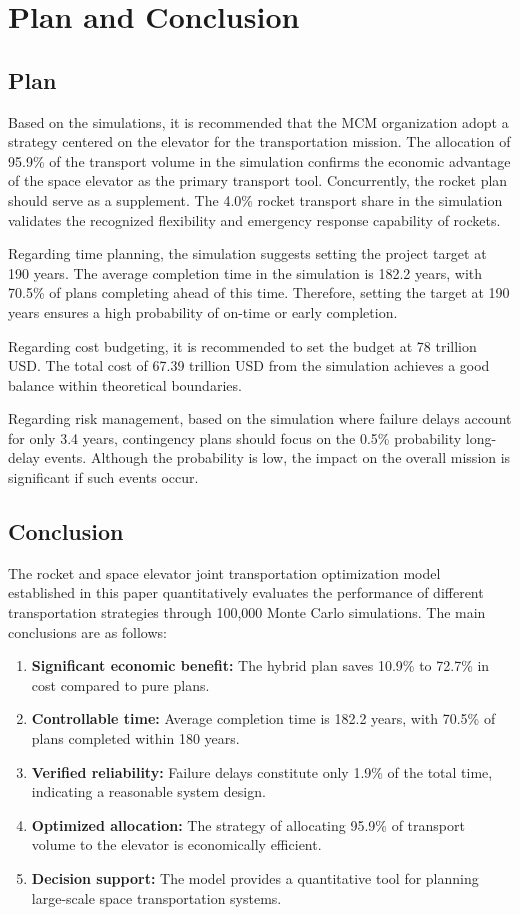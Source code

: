 \documentclass{article}
\begin{document}
\section{Plan and Conclusion}
\subsection{Plan}
Based on the simulations, it is recommended that the MCM organization adopt a strategy centered on the elevator for the transportation mission. The allocation of 95.9\% of the transport volume in the simulation confirms the economic advantage of the space elevator as the primary transport tool. Concurrently, the rocket plan should serve as a supplement. The 4.0\% rocket transport share in the simulation validates the recognized flexibility and emergency response capability of rockets.

Regarding time planning, the simulation suggests setting the project target at 190 years. The average completion time in the simulation is 182.2 years, with 70.5\% of plans completing ahead of this time. Therefore, setting the target at 190 years ensures a high probability of on-time or early completion.

Regarding cost budgeting, it is recommended to set the budget at 78 trillion USD. The total cost of 67.39 trillion USD from the simulation achieves a good balance within theoretical boundaries.

Regarding risk management, based on the simulation where failure delays account for only 3.4 years, contingency plans should focus on the 0.5\% probability long-delay events. Although the probability is low, the impact on the overall mission is significant if such events occur.

\subsection{Conclusion}
The rocket and space elevator joint transportation optimization model established in this paper quantitatively evaluates the performance of different transportation strategies through 100,000 Monte Carlo simulations. The main conclusions are as follows:
\begin{enumerate}
    \item \textbf{Significant economic benefit:} The hybrid plan saves 10.9\% to 72.7\% in cost compared to pure plans.
    \item \textbf{Controllable time:} Average completion time is 182.2 years, with 70.5\% of plans completed within 180 years.
    \item \textbf{Verified reliability:} Failure delays constitute only 1.9\% of the total time, indicating a reasonable system design.
    \item \textbf{Optimized allocation:} The strategy of allocating 95.9\% of transport volume to the elevator is economically efficient.
    \item \textbf{Decision support:} The model provides a quantitative tool for planning large-scale space transportation systems.
\end{enumerate}
\end{document}
